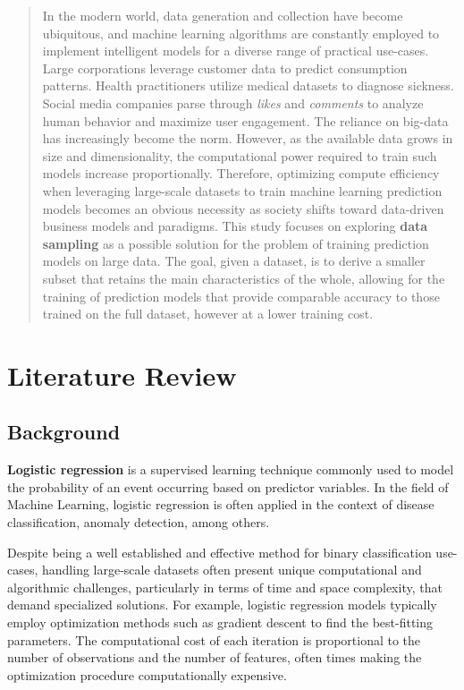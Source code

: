 \documentclass{article}
\theoremstyle{plain}
\theoremstyle{definition}
\theoremstyle{remark}
\begin{document}
\begin{abstract}

In the modern world, data generation and collection have become ubiquitous, and machine learning algorithms are constantly employed to implement intelligent models for a diverse range of practical use-cases. Large corporations leverage customer data to predict consumption patterns. Health practitioners utilize medical datasets to diagnose sickness. Social media companies parse through \textit{likes} and \textit{comments} to analyze human behavior and maximize user engagement. The reliance on big-data has increasingly become the norm. However, as the available data grows in size and dimensionality, the computational power required to train such models increase proportionally. Therefore, optimizing compute efficiency when leveraging large-scale datasets to train machine learning prediction models becomes an obvious necessity as society shifts toward data-driven business models and paradigms. This study focuses on exploring \textbf{data sampling} as a possible solution for the problem of training prediction models on large data. The goal, given a dataset, is to derive a smaller subset that retains the main characteristics of the whole, allowing for the training of prediction models that provide comparable accuracy to those trained on the full dataset, however at a lower training cost.

\end{abstract}

\section{Literature Review}
\label{submission}

\subsection{Background}

\textbf{Logistic regression} is a supervised learning technique commonly used to model the probability of an event occurring based on predictor variables. In the field of Machine Learning, logistic regression is often applied in the context of disease classification, anomaly detection, among others.

Despite being a well established and effective method for binary classification use-cases, handling large-scale datasets often present unique computational and algorithmic challenges, particularly in terms of time and space complexity, that demand specialized solutions. For example, logistic regression models typically employ optimization methods such as gradient descent to find the best-fitting parameters. The computational cost of each iteration is proportional to the number of observations and the number of features, often times making the optimization procedure computationally expensive.
\end{document}
